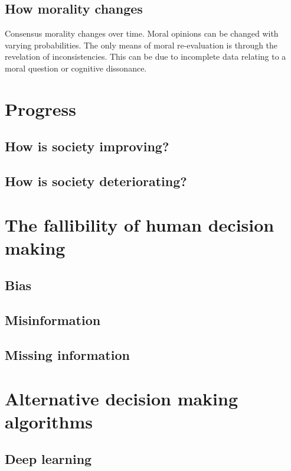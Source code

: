 \subsection{How morality changes}
Consensus morality changes over time.
Moral opinions can be changed with varying probabilities.
The only means of moral re-evaluation is through the revelation of inconsistencies.
This can be due to incomplete data relating to a moral question or cognitive dissonance.

\section{Progress}

\subsection{How is society improving?}

\subsection{How is society deteriorating?}

\section{The fallibility of human decision making}
\subsection{Bias}
\subsection{Misinformation}
\subsection{Missing information}

\section{Alternative decision making algorithms}
\subsection{Deep learning}
